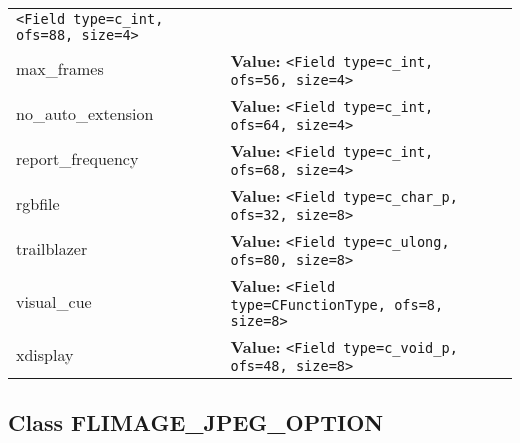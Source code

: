 \begin{longtable}{|p{\varnamewidth}|p{\vardescrwidth}|l}
{\tt {\textless}Field type=c\_int, ofs=88, size=4{\textgreater}}&\\
\cline{1-2}
\raggedright m\-a\-x\-\_\-f\-r\-a\-m\-e\-s\- & \raggedright \textbf{Value:} 
{\tt {\textless}Field type=c\_int, ofs=56, size=4{\textgreater}}&\\
\cline{1-2}
\raggedright n\-o\-\_\-a\-u\-t\-o\-\_\-e\-x\-t\-e\-n\-s\-i\-o\-n\- & \raggedright \textbf{Value:} 
{\tt {\textless}Field type=c\_int, ofs=64, size=4{\textgreater}}&\\
\cline{1-2}
\raggedright r\-e\-p\-o\-r\-t\-\_\-f\-r\-e\-q\-u\-e\-n\-c\-y\- & \raggedright \textbf{Value:} 
{\tt {\textless}Field type=c\_int, ofs=68, size=4{\textgreater}}&\\
\cline{1-2}
\raggedright r\-g\-b\-f\-i\-l\-e\- & \raggedright \textbf{Value:} 
{\tt {\textless}Field type=c\_char\_p, ofs=32, size=8{\textgreater}}&\\
\cline{1-2}
\raggedright t\-r\-a\-i\-l\-b\-l\-a\-z\-e\-r\- & \raggedright \textbf{Value:} 
{\tt {\textless}Field type=c\_ulong, ofs=80, size=8{\textgreater}}&\\
\cline{1-2}
\raggedright v\-i\-s\-u\-a\-l\-\_\-c\-u\-e\- & \raggedright \textbf{Value:} 
{\tt {\textless}Field type=CFunctionType, ofs=8, size=8{\textgreater}}&\\
\cline{1-2}
\raggedright x\-d\-i\-s\-p\-l\-a\-y\- & \raggedright \textbf{Value:} 
{\tt {\textless}Field type=c\_void\_p, ofs=48, size=8{\textgreater}}&\\
\cline{1-2}
\end{longtable}



\subsection{Class FLIMAGE\_JPEG\_OPTION}

